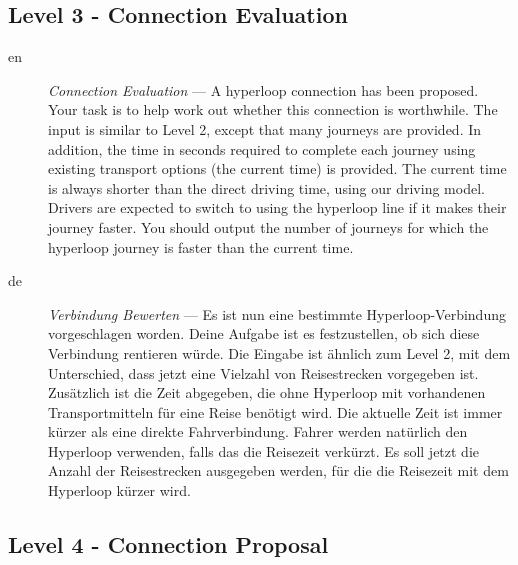 \documentclass[a4paper,11pt]{article}
\begin{document}
\subsection{Level 3 - Connection Evaluation}

\begin{description} %
  \item[en] \emph{Connection Evaluation} --- 
    A hyperloop connection has been proposed. Your task is to help work out whether
    this connection is worthwhile.
    The input is similar to Level 2, except that many journeys are provided. In
    addition, the time in seconds required to complete each journey using existing
    transport options (the current time) is provided. The current time is always
    shorter than the direct driving time, using our driving model.
    Drivers are expected to switch to using the hyperloop line if it makes their
    journey faster.
    You should output the number of journeys for which the hyperloop journey is
    faster than the current time.
  
  \item[de] \emph{Verbindung Bewerten} --- 
    Es ist nun eine bestimmte Hyperloop-Verbindung vorgeschlagen worden. Deine
    Aufgabe ist es festzustellen, ob sich diese Verbindung rentieren würde.
    Die Eingabe ist ähnlich zum Level 2, mit dem Unterschied, dass jetzt eine
    Vielzahl von Reisestrecken vorgegeben ist. Zusätzlich ist die Zeit abgegeben,
    die ohne Hyperloop mit vorhandenen Transportmitteln für eine Reise benötigt
    wird. Die aktuelle Zeit ist immer kürzer als eine direkte Fahrverbindung.
    Fahrer werden natürlich den Hyperloop verwenden, falls das die Reisezeit
    verkürzt.
    Es soll jetzt die Anzahl der Reisestrecken ausgegeben werden, für die die
    Reisezeit mit dem Hyperloop kürzer wird.
  
\end{description}

\subsection{Level 4 - Connection Proposal}
\end{document}

